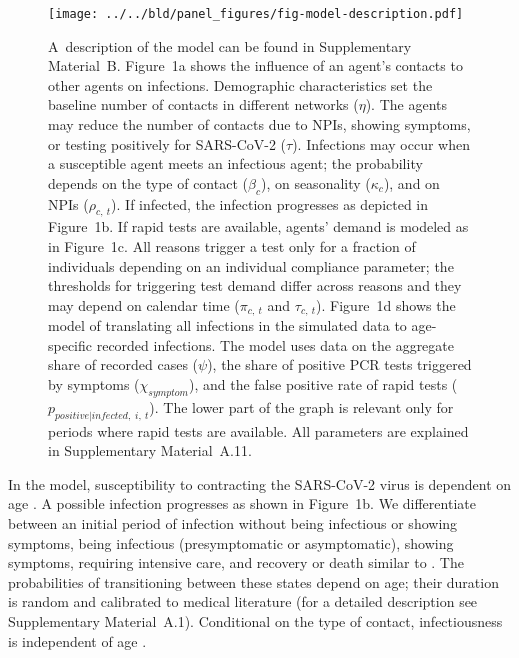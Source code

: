 \documentclass[fleqn,10pt]{wlscirep}
\begin{document}
\begin{figure}[tb]
    \centering
    \texttt{[image: ../../bld/panel\_figures/fig-model-description.pdf]}
    \caption{
        A~description of the model can be found in Supplementary Material~B. Figure~1a
        shows the influence of an agent's contacts to other agents on infections.
        Demographic characteristics set the baseline number of contacts in different
        networks ($\eta$). The agents may reduce the number of contacts due to NPIs,
        showing symptoms, or testing positively for SARS-CoV-2 ($\tau$). Infections may
        occur when a susceptible agent meets an infectious agent; the probability
        depends on the type of contact ($\beta_c$), on seasonality ($\kappa_c$), and on
        NPIs ($\rho_{c,\:t}$). If infected, the infection progresses as depicted in
        Figure~1b. If rapid tests are available, agents' demand is modeled as in
        Figure~1c. All reasons trigger a test only for a fraction of individuals
        depending on an individual compliance parameter; the thresholds for triggering
        test demand differ across reasons and they may depend on calendar time
        ($\pi_{c,\:t}$ and $\tau_{c,\:t}$). Figure~1d shows the model of translating all
        infections in the simulated data to age-specific recorded infections. The model
        uses data on the aggregate share of recorded cases ($\psi$), the share of
        positive PCR tests triggered by symptoms ($\chi_{symptom}$), and the false
        positive rate of rapid tests ($p_{positive|infected,\;i,\:t}$). The lower part
        of the graph is relevant only for periods where rapid tests are available. All
        parameters are explained in Supplementary Material~A.11.
    }
    \label{fig:model_description}
\end{figure}

In the model, susceptibility to contracting the SARS-CoV-2 virus is dependent on age
\cite{Davies2020,Goldstein2021}. A possible infection progresses as shown in Figure~1b.
We differentiate between an initial period of infection without being infectious or
showing symptoms, being infectious (presymptomatic or asymptomatic), showing symptoms,
requiring intensive care, and recovery or death similar to \cite{Aleta2020}. The
probabilities of transitioning between these states depend on age; their duration is
random and calibrated to medical literature (for a detailed description see
Supplementary Material~A.1). Conditional on the type of contact, infectiousness is
independent of age \cite{Jones2021}.
\end{document}
